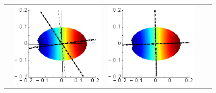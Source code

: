 \documentclass[a4paper,11pt]{article}
\begin{document}
\begin{figure}[h]
\begin{tabular*}{1\textwidth}{c|cc|cc|}
\begin{minipage}{0.22\linewidth}
\end{minipage}&
\begin{minipage}{0.22\linewidth}
	\includegraphics[width=1\linewidth]{./images/SAFE/SAFE_CS_15x10_HTI_45/P_s_3_0kHz-pstool.eps}		
\end{minipage}&
\begin{minipage}{0.22\linewidth}
	\includegraphics[width=1\linewidth]{./images/SAFE/SAFE_CS_15x10_HTI_45/P_s_7_2kHz-pstool.eps}		

\end{minipage}
\end{tabular*}
\end{figure}
\end{document}
